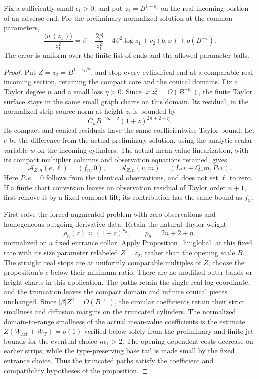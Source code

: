 \begin{lemma}\label{phase:inner-evaluation}
Fix a sufficiently small $\epsilon_1>0$, and put
$z_1=B^{1-\epsilon_1}$ on the real incoming portion of an adverse end.
For the preliminary normalized solution at the common parameters,
\begin{equation}
 \frac{\langle w(z_1)\rangle}{z_1^2}
 =\beta-\frac{2\beta}{z_1^2}-4\beta^2\log z_1+c_2(b,x)
                                                   +o(B^{-4}).
 \label{phase:inner-value}
\end{equation}
The error is uniform over the finite list of ends and the allowed
parameter balls.
\end{lemma}
\begin{proof}
Put $Z=z_2=B^{1-\epsilon_1/2}$, and stop every cylindrical end at a
comparable real incoming section, retaining the compact core and the
conical domains.  Fix a Taylor degree $n$ and a small loss $\eta>0$.
Since $|x|z_2^2=O(B^{-\epsilon_1})$, the finite Taylor surface stays in
the same small graph charts on this domain.  Its residual, in the
normalized strip source norm at height $z$, is bounded by
\[
       C_n B^{-2n-2}(1+z)^{2n+2+\eta}.
\]
Its compact and conical residuals have the same coefficientwise Taylor
bound.  Let $e$ be the difference from the actual preliminary solution,
using the analytic scalar variable $w$ on the incoming cylinders.
The actual mean-value linearization, with its compact multiplier columns
and observation equations retained, gives
\[
 \mathcal A_{Z,n}(e,\ell)=(f_n,0),\qquad
 \mathcal A_{Z,n}(v,m)=(L_*v+Q_*m,P_*v).
\]
Here $P_*e=0$ follows from the identical observations, and does not set
$\ell$ to zero.  If a finite chart conversion leaves an observation
residual of Taylor order $n+1$, first remove it by a fixed compact lift;
its contribution has the same bound as $f_n$.

First solve the forced augmented problem with zero observations and
homogeneous outgoing derivative data.  Retain the natural Taylor weight
\[
       \rho_n(z)\asymp(1+z)^{p_n},\qquad p_n=2n+2+\eta,
\]
normalized on a fixed entrance collar.  Apply
Proposition~\ref{lin:global} at this fixed rate with its size parameter
relabeled $Z=z_2$, rather than the opening scale $B$.  The straight
real stops are at uniformly comparable multiples of $Z$; choose the
proposition's $c$ below their minimum ratio.  There are no modified
outer bands or height charts in this application.  The paths retain
the single real log coordinate, and the truncation leaves the compact
domain and infinite conical pieces unchanged.  Since
$|\beta|Z^2=O(B^{-\epsilon_1})$,
the circular coefficients retain their strict smallness and diffusion
margins on the truncated cylinders.  The normalized domain-to-range
smallness of the actual mean-value coefficients is the estimate
$Z(W_{\mathrm{act}}+W_{\mathrm T})=o(1)$ verified below solely from
the preliminary and finite-jet bounds for the eventual choice
$n\epsilon_1>2$.  The opening-dependent costs decrease on earlier
strips, while the type-preserving base tail is made small by the fixed
entrance choice.  Thus the truncated paths satisfy the
coefficient and compatibility hypotheses of the proposition.


\end{proof}
